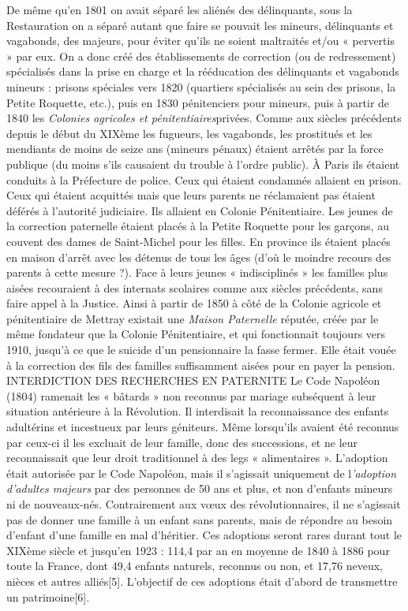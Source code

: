  De même qu'en 1801 on avait séparé les aliénés des délinquants, sous la Restauration on a séparé autant que faire se pouvait les mineurs, délinquants et vagabonds, des majeurs, pour éviter qu'ils ne soient maltraités et/ou « pervertis » par eux. On a donc créé des établissements de correction (ou de redressement) spécialisés dans la prise en charge et la rééducation des délinquants et vagabonds mineurs : prisons spéciales vers 1820 (quartiers spécialisés au sein des prisons, la Petite Roquette, etc.), puis en 1830 pénitenciers pour mineurs, puis à partir de 1840 les \emph{Colonies agricoles et pénitentiaires}privées. Comme aux siècles précédents depuis le début du XIXème les fugueurs, les vagabonds, les prostitués et les mendiants de moins de seize ans (mineurs pénaux) étaient arrêtés par la force publique (du moins s'ils causaient du trouble à l'ordre public). À Paris ils étaient conduits à la Préfecture de police. Ceux qui étaient condamnés allaient en prison. Ceux qui étaient acquittés mais que leurs parents ne réclamaient pas étaient déférés à l'autorité judiciaire. Ils allaient en Colonie Pénitentiaire.
 Les jeunes de la correction paternelle étaient placés à la Petite Roquette pour les garçons, au couvent des dames de Saint-Michel pour les filles. En province ils étaient placés en maison d'arrêt avec les détenus de tous les âges (d'où le moindre recours des parents à cette mesure ?). 
 Face à leurs jeunes « indisciplinés » les familles plus aisées recouraient à des internats scolaires comme aux siècles précédents, sans faire appel à la Justice. Ainsi à partir de 1850 à côté de la Colonie agricole et pénitentiaire de Mettray existait une \emph{Maison Paternelle} réputée, créée par le même fondateur que la Colonie Pénitentiaire, et qui fonctionnait toujours vers 1910, jusqu'à ce que le suicide d'un pensionnaire la fasse fermer. Elle était vouée à la correction des fils des familles suffisamment aisées pour en payer la pension.
INTERDICTION DES RECHERCHES EN PATERNITE
 Le Code Napoléon (1804) ramenait les « bâtards » non reconnus par mariage subséquent à leur situation antérieure à la Révolution. Il interdisait la reconnaissance des enfants adultérins et incestueux par leurs géniteurs. Même lorsqu'ils avaient été reconnus par ceux-ci il les excluait de leur famille, donc des successions, et ne leur reconnaissait que leur droit traditionnel à des legs « alimentaires ». 
 L'adoption était autorisée par le Code Napoléon, mais il s'agissait uniquement de l\emph{'adoption d'adultes majeurs} par des personnes de 50 ans et plus, et non d'enfants mineurs ni de nouveaux-nés. Contrairement aux vœux des révolutionnaires, il ne s'agissait pas de donner une famille à un enfant sans parents, mais de répondre au besoin d'enfant d'une famille en mal d'héritier. Ces adoptions seront rares durant tout le XIXème siècle et jusqu'en 1923 : 114,4 par an en moyenne de 1840 à 1886 pour toute la France, dont 49,4 enfants naturels, reconnus ou non, et 17,76 neveux, nièces et autres alliés[5]. L'objectif de ces adoptions était d'abord de transmettre un patrimoine[6]. 
